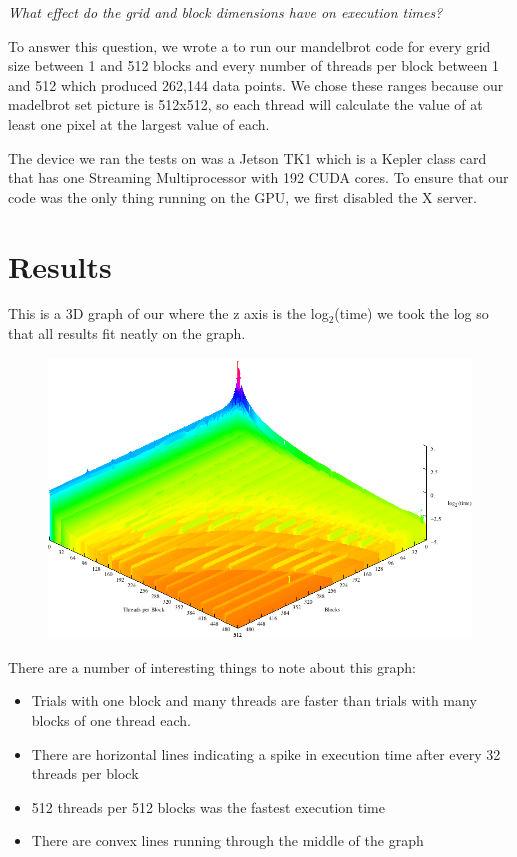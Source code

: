 \documentclass[letterpaper,10pt,openany,oneside]{sphinxmanual}
\begin{document}
\emph{What effect do the grid and block dimensions have
on execution times?}

To answer this question, we wrote a
 to run our mandelbrot code
for every
grid size between 1 and 512  blocks and every number of threads
per block between 1 and 512 which produced 262,144 data
points. We chose these ranges because our madelbrot set picture is
512x512, so each thread will calculate the value of at least
one pixel at the largest value of each.

The device we ran the tests on was a Jetson TK1 which is
a Kepler class card that has
one Streaming Multiprocessor with 192 CUDA cores. To ensure
that our code was the only thing running on the GPU, we
first disabled the X server.


\section{Results}
\label{2-Findings/Findings:results}
This is a 3D graph of our 
where the z axis is the
log$_{\text{2}}$(time) we took the log so that all results
fit neatly on the graph.
\begin{figure}[htbp]
\centering

\includegraphics{MediumPlot.png}
\end{figure}

There are a number of interesting things to note about this
graph:
\begin{itemize}
\item {} 
Trials with one block and many threads are faster than
trials with many blocks of one thread each.

\item {} 
There are horizontal lines indicating a spike in execution
time after every 32 threads per block

\item {} 
512 threads per 512 blocks was the fastest execution time

\item {} 
There are convex lines running through the middle of the
graph

\end{itemize}
\end{document}
